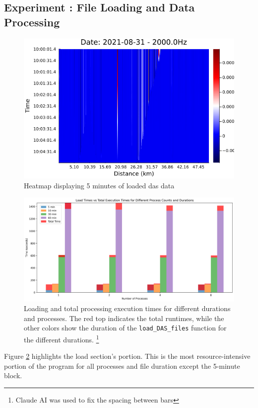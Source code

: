 \subsection{Experiment : File Loading and Data Processing}

\begin{figure}[!h]
    \centering
    \includegraphics[width=0.8\linewidth]{figures/heatmap_das_test.png}
    \caption{Heatmap displaying 5 minutes of loaded \acrshort{das} data}
    \label{fig:dasoutput}
\end{figure}

\begin{figure}[!h]
    \centering
    \includegraphics[scale=0.50]{figures/judasex.png}
    \caption{Loading and total processing execution times for different durations and processes. The red top indicates the total runtimes, while the other colors show the duration of the \lstinline{load_DAS_files} function for the different durations. \footnote{Claude AI was used to fix the spacing between bars}}
    \label{fig:judasextime}
\end{figure}

Figure \ref{fig:judasextime} highlights the load section's portion. This is the most resource-intensive portion of the program for all processes and file duration except the 5-minute block. 


